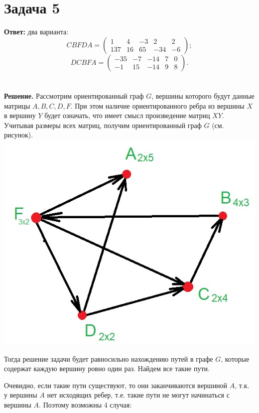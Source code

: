 \documentclass{article}
\begin{document}
\section*{Задача 5}
{\bf Ответ:} два варианта:
$$CBFDA=\left(\begin{array}{ccccc}1 & 4 & -3 & 2 & 2\\137 & 16 & 65 & -34 & -6\end{array}\right);$$
$$DCBFA=\left(\begin{array}{ccccc}-35 & -7 & -14 & 7 & 0\\-1 & 15 & -14 & 9 & 8\end{array}\right).$$
\\
\\
{\bf Решение.} Рассмотрим ориентированный граф $G$, вершины которого будут данные матрицы $A, B, C, D, F$. При этом наличие ориентированного ребра из вершины $X$ в вершину $Y$ будет означать, что имеет смысл произведение матриц $XY$. Учитывая размеры всех матриц, получим ориентированный граф $G$ (см. рисунок).
\\
{\includegraphics[scale=0.4]{img/img1.jpg}}
\\
\par
Тогда решение задачи будет равносильно нахождению путей в графе $G$, которые содержат каждую вершину ровно один раз. Найдем все такие пути.
\par
Очевидно, если такие пути существуют, то они заканчиваются вершиной $A$, т.к. у вершины $A$ нет исходящих ребер, т.е. такие пути не могут начинаться с вершины $A$. Поэтому возможны 4 случая:
\end{document}
